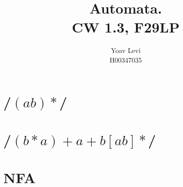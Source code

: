 \documentclass{article} %
\title{%
  Automata. \\
  \large CW 1.3, F29LP}
\author{%
Yoav Levi\\
\small H00347035
} %
\date{}
\begin{document}
    \maketitle %
    
    \section{/$(ab)*$/} %
    \section{/$(b*a)+a+b[ab]*$/}
    \section{NFA}
\end{document}
